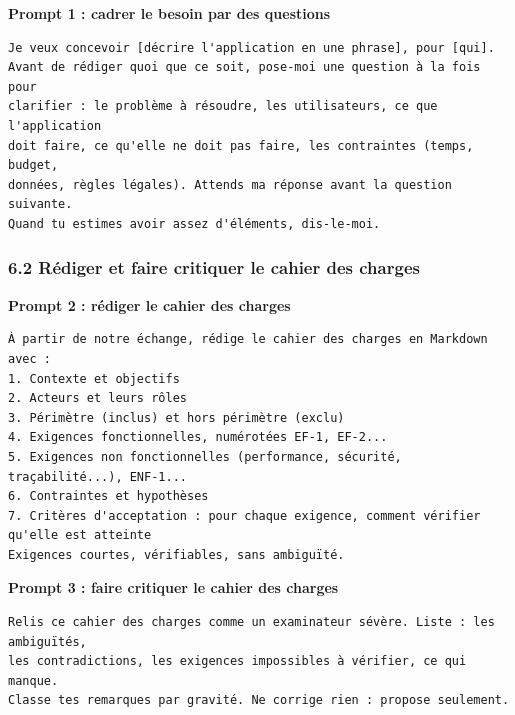 \documentclass[
  french,
  11pt,
  a4paper,
]{article}
\begin{document}
\textbf{Prompt 1 : cadrer le besoin par des questions}

\begin{Verbatim}[breaklines=true,breakanywhere=true,fontsize=\small,frame=leftline,framerule=1.6pt,rulecolor=\color{credixblue},framesep=3mm,xleftmargin=2mm,xrightmargin=1mm]
Je veux concevoir [décrire l'application en une phrase], pour [qui].
Avant de rédiger quoi que ce soit, pose-moi une question à la fois pour
clarifier : le problème à résoudre, les utilisateurs, ce que l'application
doit faire, ce qu'elle ne doit pas faire, les contraintes (temps, budget,
données, règles légales). Attends ma réponse avant la question suivante.
Quand tu estimes avoir assez d'éléments, dis-le-moi.
\end{Verbatim}

\subsubsection{6.2 Rédiger et faire critiquer le cahier des
charges}\label{62-ruxe9diger-et-faire-critiquer-le-cahier-des-charges}

\textbf{Prompt 2 : rédiger le cahier des charges}

\begin{Verbatim}[breaklines=true,breakanywhere=true,fontsize=\small,frame=leftline,framerule=1.6pt,rulecolor=\color{credixblue},framesep=3mm,xleftmargin=2mm,xrightmargin=1mm]
À partir de notre échange, rédige le cahier des charges en Markdown avec :
1. Contexte et objectifs
2. Acteurs et leurs rôles
3. Périmètre (inclus) et hors périmètre (exclu)
4. Exigences fonctionnelles, numérotées EF-1, EF-2...
5. Exigences non fonctionnelles (performance, sécurité, traçabilité...), ENF-1...
6. Contraintes et hypothèses
7. Critères d'acceptation : pour chaque exigence, comment vérifier qu'elle est atteinte
Exigences courtes, vérifiables, sans ambiguïté.
\end{Verbatim}

\textbf{Prompt 3 : faire critiquer le cahier des charges}

\begin{Verbatim}[breaklines=true,breakanywhere=true,fontsize=\small,frame=leftline,framerule=1.6pt,rulecolor=\color{credixblue},framesep=3mm,xleftmargin=2mm,xrightmargin=1mm]
Relis ce cahier des charges comme un examinateur sévère. Liste : les ambiguïtés,
les contradictions, les exigences impossibles à vérifier, ce qui manque.
Classe tes remarques par gravité. Ne corrige rien : propose seulement.
\end{Verbatim}
\end{document}
